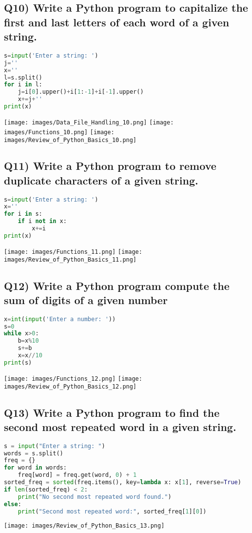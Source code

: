 \documentclass{article}
\begin{document}
\subsection*{Q10) Write a Python program to capitalize the first and last letters of each word of a given string.}
\begin{lstlisting}[language=Python]
s=input('Enter a string: ')
j=''
x=''
l=s.split()
for i in l:
    j=i[0].upper()+i[1:-1]+i[-1].upper()
    x+=j+''
print(x)
\end{lstlisting}
\texttt{[image: images/Data\_File\_Handling\_10.png]}
\texttt{[image: images/Functions\_10.png]}
\texttt{[image: images/Review\_of\_Python\_Basics\_10.png]}

\subsection*{Q11) Write a Python program to remove duplicate characters of a given string.}
\begin{lstlisting}[language=Python]
s=input('Enter a string: ')
x=''
for i in s:
    if i not in x:
        x+=i
print(x)
\end{lstlisting}
\texttt{[image: images/Functions\_11.png]}
\texttt{[image: images/Review\_of\_Python\_Basics\_11.png]}

\subsection*{Q12) Write a Python program compute the sum of digits of a given number}
\begin{lstlisting}[language=Python]
x=int(input('Enter a number: '))
s=0
while x>0:
    b=x%10
    s+=b
    x=x//10
print(s)
\end{lstlisting}
\texttt{[image: images/Functions\_12.png]}
\texttt{[image: images/Review\_of\_Python\_Basics\_12.png]}

\subsection*{Q13) Write a Python program to find the second most repeated word in a given string.}
\begin{lstlisting}[language=Python]
s = input("Enter a string: ")
words = s.split()
freq = {}
for word in words:
    freq[word] = freq.get(word, 0) + 1
sorted_freq = sorted(freq.items(), key=lambda x: x[1], reverse=True)
if len(sorted_freq) < 2:
    print("No second most repeated word found.")
else:
    print("Second most repeated word:", sorted_freq[1][0])
\end{lstlisting}
\texttt{[image: images/Review\_of\_Python\_Basics\_13.png]}
\end{document}
